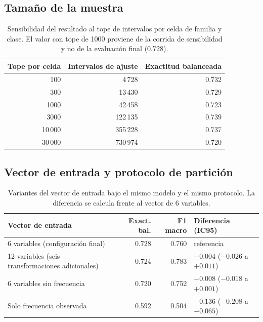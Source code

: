 \subsection{Tamaño de la muestra}

\begin{table}[H]
\centering
\caption[Sensibilidad al tope de intervalos por celda]{Sensibilidad del resultado al tope de intervalos por celda de familia y clase. El valor con tope de 1000 proviene de la corrida de sensibilidad y no de la evaluación final (0.728).}
\label{tab:cpu-tope-muestreo}
\small
\begin{tabular}{@{}rrr@{}}
\toprule
\textbf{Tope por celda} & \textbf{Intervalos de ajuste} & \textbf{Exactitud balanceada} \\
\midrule
100 & 4\,728 & 0.732 \\
300 & 13\,430 & 0.729 \\
1000 & 42\,458 & 0.723 \\
3000 & 122\,135 & 0.739 \\
10\,000 & 355\,228 & 0.737 \\
30\,000 & 730\,974 & 0.720 \\
\bottomrule
\end{tabular}
\end{table}

\subsection{Vector de entrada y protocolo de partición}

\begin{table}[H]
\centering
\caption[Variantes del vector de entrada]{Variantes del vector de entrada bajo el mismo modelo y el mismo protocolo. La diferencia se calcula frente al vector de 6 variables.}
\label{tab:cpu-variantes-entrada}
\small
\setlength{\tabcolsep}{3pt}
\begin{tabular}{@{}p{4.9cm}rrp{5.3cm}@{}}
\toprule
\textbf{Vector de entrada} & \textbf{Exact. bal.} & \textbf{F1 macro} & \textbf{Diferencia (IC95)} \\
\midrule
6 variables (configuración final) & 0.728 & 0.760 & referencia \\
12 variables (seis transformaciones adicionales) & 0.724 & 0.783 & $-0.004$ \;($-0.026$ a $+0.011$) \\
6 variables sin frecuencia & 0.720 & 0.752 & $-0.008$ \;($-0.018$ a $+0.001$) \\
Solo frecuencia observada & 0.592 & 0.504 & $-0.136$ \;($-0.208$ a $-0.065$) \\
\bottomrule
\end{tabular}
\end{table}

